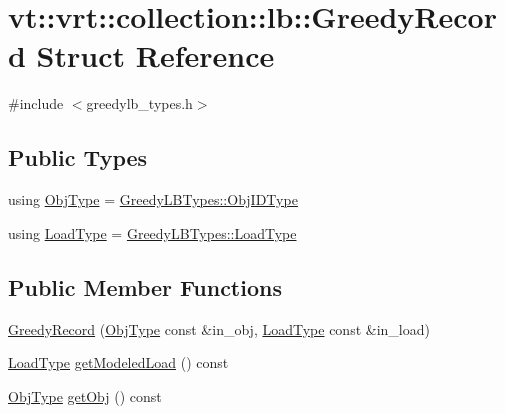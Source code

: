 \hypertarget{structvt_1_1vrt_1_1collection_1_1lb_1_1_greedy_record}{}\section{vt\+:\+:vrt\+:\+:collection\+:\+:lb\+:\+:Greedy\+Record Struct Reference}
\label{structvt_1_1vrt_1_1collection_1_1lb_1_1_greedy_record}


{\ttfamily \#include $<$greedylb\+\_\+types.\+h$>$}

\subsection*{Public Types}
\begin{DoxyCompactItemize}
\item 
using \hyperlink{structvt_1_1vrt_1_1collection_1_1lb_1_1_greedy_record_a6b0754b2434fca9e865fa8422e3d709e}{Obj\+Type} = \hyperlink{structvt_1_1vrt_1_1collection_1_1lb_1_1_greedy_l_b_types_ae22670acd689e4ff83315fac2e4acb5e}{Greedy\+L\+B\+Types\+::\+Obj\+I\+D\+Type}
\item 
using \hyperlink{structvt_1_1vrt_1_1collection_1_1lb_1_1_greedy_record_a3ac0f749c48eb624837eda5bca988845}{Load\+Type} = \hyperlink{structvt_1_1vrt_1_1collection_1_1lb_1_1_greedy_l_b_types_a9fe8829bc0c92e88ddf9d149233a54f4}{Greedy\+L\+B\+Types\+::\+Load\+Type}
\end{DoxyCompactItemize}
\subsection*{Public Member Functions}
\begin{DoxyCompactItemize}
\item 
\hyperlink{structvt_1_1vrt_1_1collection_1_1lb_1_1_greedy_record_a150272bcbce22418638bb702093d4bf2}{Greedy\+Record} (\hyperlink{structvt_1_1vrt_1_1collection_1_1lb_1_1_greedy_record_a6b0754b2434fca9e865fa8422e3d709e}{Obj\+Type} const \&in\+\_\+obj, \hyperlink{structvt_1_1vrt_1_1collection_1_1lb_1_1_greedy_record_a3ac0f749c48eb624837eda5bca988845}{Load\+Type} const \&in\+\_\+load)
\item 
\hyperlink{structvt_1_1vrt_1_1collection_1_1lb_1_1_greedy_record_a3ac0f749c48eb624837eda5bca988845}{Load\+Type} \hyperlink{structvt_1_1vrt_1_1collection_1_1lb_1_1_greedy_record_af9b5d5ee1c115d6bfeb67255267efb57}{get\+Modeled\+Load} () const
\item 
\hyperlink{structvt_1_1vrt_1_1collection_1_1lb_1_1_greedy_record_a6b0754b2434fca9e865fa8422e3d709e}{Obj\+Type} \hyperlink{structvt_1_1vrt_1_1collection_1_1lb_1_1_greedy_record_a5f7a3e144c43f74c587ff054af1e267f}{get\+Obj} () const
\end{DoxyCompactItemize}
